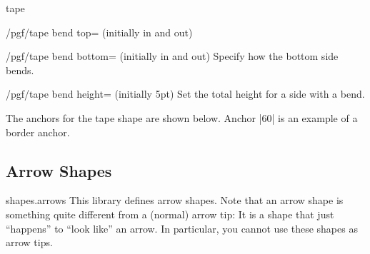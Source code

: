\begin{shape}{tape}
\begin{key}{/pgf/tape bend top= (initially in and out)}
	\end{key}
	
	\begin{key}{/pgf/tape bend bottom= (initially in and out)}
		Specify how the bottom side bends.
	\end{key}%
	
	\begin{key}{/pgf/tape bend height= (initially 5pt)}
		Set the total height for a side with a bend.
		
\begin{codeexample}[]
\end{codeexample} 
 
	\end{key}
	
	The anchors for the tape shape are shown below. Anchor |60| is an
	example of a border anchor.
	
\begin{codeexample}[]
\Huge
{}
\end{codeexample}

\end{shape}%



\subsection{Arrow Shapes}

\begin{pgflibrary}{shapes.arrows}
  This library defines arrow shapes. Note that an arrow shape is
  something quite different from a (normal) arrow tip: It is a shape
  that just ``happens'' to ``look like'' an arrow. In particular, you
  cannot use these shapes as arrow tips.
\end{pgflibrary}

